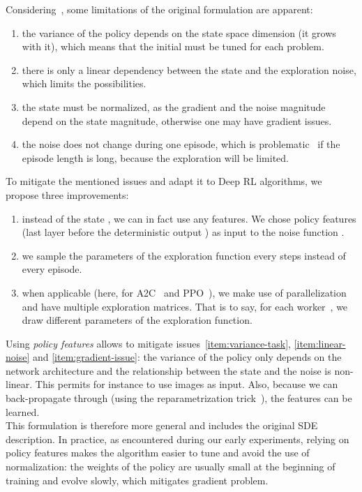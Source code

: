 \documentclass{article}
\newcommand{\SDE}{\textsc{SDE}\xspace}
\newcommand{\aac}{\textsc{A2C}\xspace}
\newcommand{\ppo}{\textsc{PPO}\xspace}
\begin{document}
Considering~, some limitations of the original formulation are apparent:

\begin{enumerate}[label=\roman*]
  \item the variance of the policy  depends on the state space dimension (it grows with it), which means that the initial  must be tuned for each problem. \label{item:variance-task}
  \item there is only a linear dependency between the state and the exploration noise, which limits the possibilities. \label{item:linear-noise}
  \item the state must be normalized, as the gradient and the noise magnitude depend on the state magnitude, otherwise one may have gradient issues. \label{item:gradient-issue}
  \item the noise does not change during one episode, which is problematic~\citep{hoof2017generalized} if the episode length is long, because the exploration will be limited. \label{item:episode-sampling}
\end{enumerate}



To mitigate the mentioned issues and adapt it to Deep RL algorithms, we propose three improvements:

\begin{enumerate}
  \item instead of the state , we can in fact use any features. We chose policy features  (last layer before the deterministic output ) as input to the noise function . \label{item:features}
  \item we sample the parameters  of the exploration function every  steps instead of every episode. \label{item:n-steps}
\item when applicable (here, for \aac~\citep{mnih2016asynchronous} and \ppo~\citep{schulman2017proximal}), we make use of parallelization and have multiple exploration matrices. That is to say, for each worker~\citep{mnih2016asynchronous}, we draw different parameters of the exploration function. \label{item:workers}
\end{enumerate}


Using \textit{policy features} allows to mitigate issues~\ref{item:variance-task}, \ref{item:linear-noise} and \ref{item:gradient-issue}: the variance of the policy only depends on the network architecture and the relationship between the state  and the noise  is non-linear. This permits for instance to use images as input. Also, because we can back-propagate through  (using the reparametrization trick~\citep{kingma2013auto}), the features can be learned.\\
This formulation is therefore more general and includes the original \SDE description. In practice, as encountered during our early experiments, relying on policy features makes the algorithm easier to tune and avoid the use of normalization: the weights of the policy are usually small at the beginning of training and evolve slowly, which mitigates gradient problem.
\end{document}
